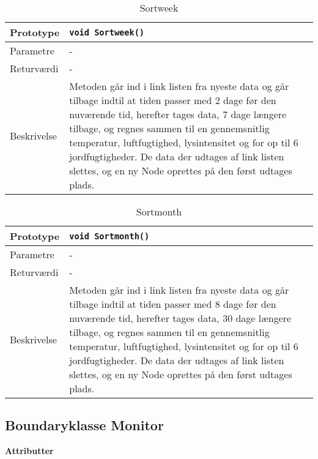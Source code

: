 \begin{table}[h]
\begin{tabularx}{\textwidth}{| >{\raggedright\arraybackslash}p{2.5 cm} | >{\raggedright\arraybackslash}X |} \hline
Prototype & \texttt{void Sortweek()} \\\hline
Parametre & - \\\hline
Returværdi & - \\\hline
Beskrivelse & Metoden går ind i link listen fra nyeste data og går tilbage indtil at tiden passer med 2 dage før den nuværende tid, herefter tages data, 7 dage længere tilbage, og regnes sammen til en gennemsnitlig temperatur, luftfugtighed, lysintensitet og for op til 6 jordfugtigheder. De data der udtages af link listen slettes, og en ny Node oprettes på den først udtages plads. \\\hline
\end{tabularx}
\caption{Sortweek}
\label{table:Sortweek}
\end{table}

\begin{table}[h]
\begin{tabularx}{\textwidth}{| >{\raggedright\arraybackslash}p{2.5 cm} | >{\raggedright\arraybackslash}X |} \hline
Prototype & \texttt{void Sortmonth()} \\\hline
Parametre & - \\\hline
Returværdi & - \\\hline
Beskrivelse & Metoden går ind i link listen fra nyeste data og går tilbage indtil at tiden passer med 8 dage før den nuværende tid, herefter tages data, 30 dage længere tilbage, og regnes sammen til en gennemsnitlig temperatur, luftfugtighed, lysintensitet og for op til 6 jordfugtigheder. De data der udtages af link listen slettes, og en ny Node oprettes på den først udtages plads. \\\hline
\end{tabularx}
\caption{Sortmonth}
\label{table:Sortmonth}
\end{table}


\clearpage




\clearpage

\subsection{Boundaryklasse Monitor}

\textbf{Attributter}

